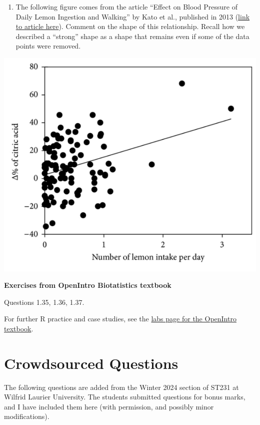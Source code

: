 \documentclass[
  letterpaper,
  DIV=11,
  numbers=noendperiod,
  oneside]{scrreprt}
\providecommand{\tightlist}{%
  \setlength{\itemsep}{0pt}\setlength{\parskip}{0pt}}\usepackage{longtable,booktabs,array}
\begin{document}
\begin{enumerate}
\def\labelenumi{\arabic{enumi}.}
\setcounter{enumi}{2}
\tightlist
\item
  The following figure comes from the article ``Effect on Blood Pressure
  of Daily Lemon Ingestion and Walking'' by Kato et al., published in
  2013 (\href{https://www.hindawi.com/journals/jnme/2014/912684/}{link
  to article here}). Comment on the shape of this relationship. Recall
  how we described a ``strong'' shape as a shape that remains even if
  some of the data points were removed.
\end{enumerate}

\includegraphics{figs/lemon.png}

\textbf{Exercises from OpenIntro Biotatistics textbook}

Questions 1.35, 1.36, 1.37.

For further R practice and case studies, see the
\href{https://www.openintro.org/book/statlabs/?labblock=biostat_intro_to_data}{labs
page for the OpenIntro textbook}.

\hypertarget{crowdsourced-questions-2}{%
\section{Crowdsourced Questions}\label{crowdsourced-questions-2}}

The following questions are added from the Winter 2024 section of ST231
at Wilfrid Laurier University. The students submitted questions for
bonus marks, and I have included them here (with permission, and
possibly minor modifications).
\end{document}
